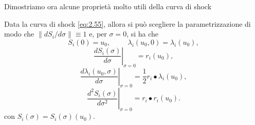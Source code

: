 Dimostriamo ora alcune proprietà molto utili della curva di shock
\begin{teorema}
    Data la curva di shock \eqref{eq:2.55}, allora si può scegliere la parametrizzazione di modo che $\|dS_{i}/d\sigma\|\equiv 1$ e, per $\sigma = 0$, si ha che
    \begin{equation}\label{eq:2.57}
        S_{i}(0)=u_{0}, \hspace{1cm} \lambda_{i}(u_{0},0)=\lambda_{i}(u_{0}),
    \end{equation}
    \begin{equation}\label{eq:2.58}
        \left.\frac{dS_{i}(\sigma)}{d\sigma}\right|_{\sigma = 0}=r_{i}(u_{0}),
    \end{equation}
    \begin{equation}\label{eq:2.59}
        \left.\frac{d\lambda_{i}(u_{0},\sigma)}{d\sigma}\right|_{\sigma = 0}=\frac{1}{2}r_{i}\bullet\lambda_{i}(u_{0}),
    \end{equation}
    \begin{equation}\label{eq:2.60}
        \left.\frac{d^{2}S_{i}(\sigma)}{d\sigma^{2}}\right|_{\sigma = 0}=r_{i}\bullet r_{i}(u_{0}).
    \end{equation}
    con $S_{i}(\sigma) = S_{i}(\sigma)(u_{0})$.
\end{teorema}
